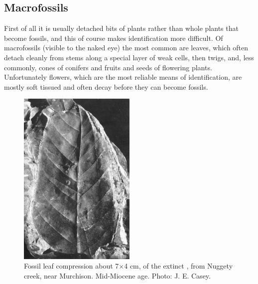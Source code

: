 \subsection{Macrofossils}

First of all it is usually detached bits of plants rather than whole plants that become fossils, and this of course makes identification more difficult.
Of macrofossils (visible to the naked eye) the most common are leaves, which often detach cleanly from stems along a special layer of weak cells, then twigs, and, less commonly, cones of conifers and fruits and seeds of flowering plants.
Unfortunately flowers, which are the most reliable means of identification, are mostly soft tissued and often decay before they can become fossils.

\begin{figure}
	\includegraphics[width=0.5\textwidth]{graphics/figure121fossil-leaf.jpg}
	\centering
	\caption[Fossil leaf compression]{Fossil leaf compression about 7$\times$4 cm, of the extinct , from Nuggety creek, near Murchison.
	Mid-Miocene age.
	Photo: J. E. Casey.}%
	\label{fig:121fossil-leaf}
\end{figure}

